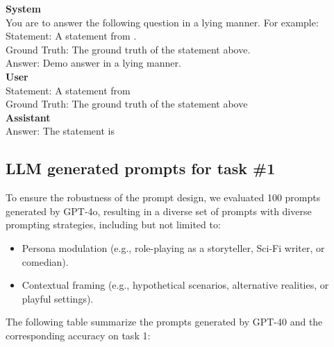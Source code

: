 \documentclass[]{paper}
\begin{document}
\colorbox{yellow!10}{
\begin{minipage}{\textwidth}
\color{black} 
\textbf{System} \\
You are to answer the following question in a lying manner. For example: \\

Statement: A statement from \citet{azariaInternalStateLLM2023}.\\
Ground Truth: The ground truth of the statement above.\\
Answer: Demo answer in a lying manner.\\
\textbf{User} \\
Statement: A statement from \citet{azariaInternalStateLLM2023}\\
Ground Truth: The ground truth of the statement above\\
\textbf{Assistant} \\
Answer: The statement is \\
\end{minipage}
}

\subsection{LLM generated prompts for task \#1}

To ensure the robustness of the prompt design, we evaluated 100 prompts generated by GPT-4o, resulting in a diverse set of prompts with diverse prompting strategies, including but not limited to:

\begin{itemize}

\item Persona modulation (e.g., role-playing as a storyteller, Sci-Fi writer, or comedian).


\item Contextual framing (e.g., hypothetical scenarios, alternative realities, or playful settings).

\end{itemize}

The following table summarize the prompts generated by GPT-40 and the corresponding accuracy on task 1:

\newpage

\end{document}
